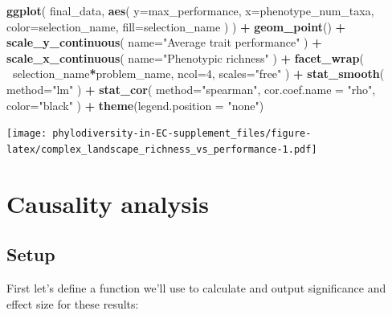 \documentclass[]{book}
\newenvironment{Shaded}{\begin{snugshade}}{\end{snugshade}}
\newcommand{\DataTypeTok}[1]{\textcolor[rgb]{0.13,0.29,0.53}{#1}}
\newcommand{\DecValTok}[1]{\textcolor[rgb]{0.00,0.00,0.81}{#1}}
\newcommand{\KeywordTok}[1]{\textcolor[rgb]{0.13,0.29,0.53}{\textbf{#1}}}
\newcommand{\NormalTok}[1]{#1}
\newcommand{\OperatorTok}[1]{\textcolor[rgb]{0.81,0.36,0.00}{\textbf{#1}}}
\newcommand{\StringTok}[1]{\textcolor[rgb]{0.31,0.60,0.02}{#1}}
\begin{document}
\begin{Shaded}
\begin{Highlighting}[]
\KeywordTok{ggplot}\NormalTok{(}
\NormalTok{    final_data,}
    \KeywordTok{aes}\NormalTok{(}
        \DataTypeTok{y=}\NormalTok{max_performance,}
        \DataTypeTok{x=}\NormalTok{phenotype_num_taxa,}
        \DataTypeTok{color=}\NormalTok{selection_name,}
        \DataTypeTok{fill=}\NormalTok{selection_name}
\NormalTok{    )}
\NormalTok{  ) }\OperatorTok{+}
\StringTok{  }\KeywordTok{geom_point}\NormalTok{() }\OperatorTok{+}
\StringTok{    }\KeywordTok{scale_y_continuous}\NormalTok{(}
        \DataTypeTok{name=}\StringTok{"Average trait performance"}
\NormalTok{  ) }\OperatorTok{+}
\StringTok{  }\KeywordTok{scale_x_continuous}\NormalTok{(}
        \DataTypeTok{name=}\StringTok{"Phenotypic richness"}
\NormalTok{  ) }\OperatorTok{+}\StringTok{ }
\StringTok{  }\KeywordTok{facet_wrap}\NormalTok{(}
      \OperatorTok{~}\NormalTok{selection_name}\OperatorTok{*}\NormalTok{problem_name, }\DataTypeTok{ncol=}\DecValTok{4}\NormalTok{, }\DataTypeTok{scales=}\StringTok{"free"}
\NormalTok{  ) }\OperatorTok{+}\StringTok{ }
\StringTok{  }\KeywordTok{stat_smooth}\NormalTok{(}
    \DataTypeTok{method=}\StringTok{"lm"}
\NormalTok{  ) }\OperatorTok{+}\StringTok{ }
\StringTok{  }\KeywordTok{stat_cor}\NormalTok{(}
    \DataTypeTok{method=}\StringTok{"spearman"}\NormalTok{, }\DataTypeTok{cor.coef.name =} \StringTok{"rho"}\NormalTok{, }\DataTypeTok{color=}\StringTok{"black"}
\NormalTok{  ) }\OperatorTok{+}
\StringTok{  }\KeywordTok{theme}\NormalTok{(}\DataTypeTok{legend.position =} \StringTok{"none"}\NormalTok{)}
\end{Highlighting}
\end{Shaded}

\texttt{[image: phylodiversity-in-EC-supplement\_files/figure-latex/complex\_landscape\_richness\_vs\_performance-1.pdf]}

\hypertarget{causality-analysis-1}{%
\section{Causality analysis}\label{causality-analysis-1}}

\hypertarget{setup-3}{%
\subsection{Setup}\label{setup-3}}

First let's define a function we'll use to calculate and output significance and effect size for these results:
\end{document}
